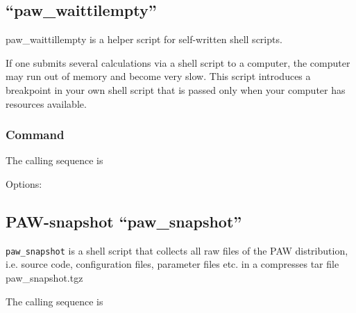 \documentclass[final,12pt,makeidx,DIV=calc]{article}
\begin{document}
{{{{{{%
\subsection{``paw\_waittilempty''}
paw\_waittillempty is a helper script for self-written shell scripts.

If one submits several calculations via a shell script to a computer, the
computer may run out of memory and become very slow. This script
introduces a breakpoint in your own shell script that is passed only
when your computer has resources available.

\subsubsection{Command}
The calling sequence is

\bigskip{}
\vspace{0.5cm}

\noindent Options:\\[2mm]
\hspace*{1cm}

\subsection{PAW-snapshot ``paw\_snapshot''}
{\tt paw\_snapshot} is a shell script that collects all raw files of
the PAW distribution, i.e. source code, configuration files,
parameter files etc. in a compresses tar file paw\_snapshot.tgz

The calling sequence is

}}}}}}
\end{document}
